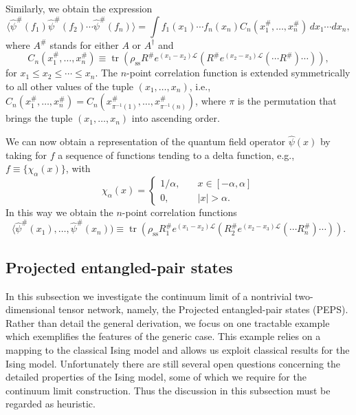 \documentclass[prl,twocolumn,lengthcheck,superscriptaddress]{revtex4-1}
\newcommand{\tr}{\operatorname{tr}}
\theoremstyle{definition}
\theoremstyle{remark}
\begin{document}
Similarly, we obtain the expression
\begin{equation}
	\langle \widehat{\psi}^{\#}(f_1)\widehat{\psi}^{\#}(f_2)\cdots \widehat{\psi}^{\#}(f_n)\rangle = \int f_1(x_1)\cdots f_n(x_n) C_n(x_1^\#, \ldots, x_n^\#)\, dx_1\cdots dx_n,
\end{equation}
where $A^\#$ stands for either $A$ or $A^\dag$ and 
\begin{equation}
	C_n(x_1^\#, \ldots, x_n^\#) \equiv \tr(\rho_{\text{ss}} R^\# e^{(x_1-x_{2})\mathcal{L}}( R^\# e^{(x_{2}-x_{3})\mathcal{L}}(\cdots R^\#)\cdots)),
\end{equation}
for $x_1 \le x_2 \le \cdots \le x_n$. The $n$-point correlation function is extended symmetrically to all other values of the tuple $(x_1, \ldots, x_n)$, i.e., $C_n(x_1^\#, \ldots, x_n^\#) = C_n(x_{\pi^{-1}(1)}^\#, \ldots, x_{\pi^{-1}(n)}^\#)$, where $\pi$ is the permutation that brings the tuple $(x_1, \ldots, x_n)$ into ascending order.

We can now obtain a representation of the quantum field operator $\widehat{\psi}(x)$ by taking for $f$ a sequence of functions tending to a delta function, e.g., $f \equiv \{\chi_\alpha(x)\}$, with 
\begin{equation}
	\chi_\alpha(x) = \begin{cases} 1/\alpha, \quad &x \in [-\alpha, \alpha]\\
	0, \quad &|x| > \alpha.\end{cases}
\end{equation}
In this way we obtain the $n$-point correlation functions
\begin{equation}
	\langle \widehat{\psi}^\#(x_1), \ldots, \widehat{\psi}^\#(x_n)) \equiv \tr(\rho_{\text{ss}} R^\#_1 e^{(x_1-x_{2})\mathcal{L}}( R^\#_{2} e^{(x_{2}-x_{3})\mathcal{L}}(\cdots R_n^\#)\cdots)).
\end{equation}

\subsection{Projected entangled-pair states}
In this subsection we investigate the continuum limit of a nontrivial two-dimensional tensor network, namely, the Projected entangled-pair states (PEPS). Rather than detail the general derivation, we focus on one tractable example \cite{verstraete:2006a} which exemplifies the features of the generic case. This example relies on a mapping to the classical Ising model and allows us exploit classical results for the Ising model. Unfortunately there are still several open questions concerning the detailed properties of the Ising model, some of which we require for the continuum limit construction. Thus the discussion in this subsection must be regarded as heuristic.
\end{document}
